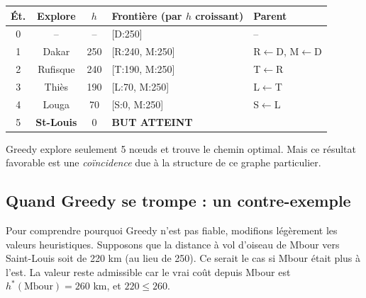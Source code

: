 \documentclass[11pt,a4paper]{article}
\begin{document}
{\small
\begin{center}
\begin{tabular}{|c|c|c|l|l|}
\hline
\textbf{Ét.} & \textbf{Explore} & $h$ & \textbf{Frontière (par $h$ croissant)} & \textbf{Parent} \\
\hline
0 & -- & -- & [D:250] & -- \\
1 & Dakar & 250 & [R:240, M:250] & R$\leftarrow$D, M$\leftarrow$D \\
2 & Rufisque & 240 & [T:190, M:250] & T$\leftarrow$R \\
3 & Thiès & 190 & [L:70, M:250] & L$\leftarrow$T \\
4 & Louga & 70 & [S:0, M:250] & S$\leftarrow$L \\
5 & \textbf{St-Louis} & 0 & \textbf{BUT ATTEINT} & \\
\hline
\end{tabular}
\end{center}
}

Greedy explore seulement 5 nœuds et trouve le chemin optimal. Mais ce résultat favorable est une \textit{coïncidence} due à la structure de ce graphe particulier.

\subsection{Quand Greedy se trompe : un contre-exemple}

Pour comprendre pourquoi Greedy n'est pas fiable, modifions légèrement les valeurs heuristiques. Supposons que la distance à vol d'oiseau de Mbour vers Saint-Louis soit de 220 km (au lieu de 250). Ce serait le cas si Mbour était plus à l'est. La valeur reste admissible car le vrai coût depuis Mbour est $h^*(\text{Mbour}) = 260$ km, et $220 \leq 260$.
\end{document}
